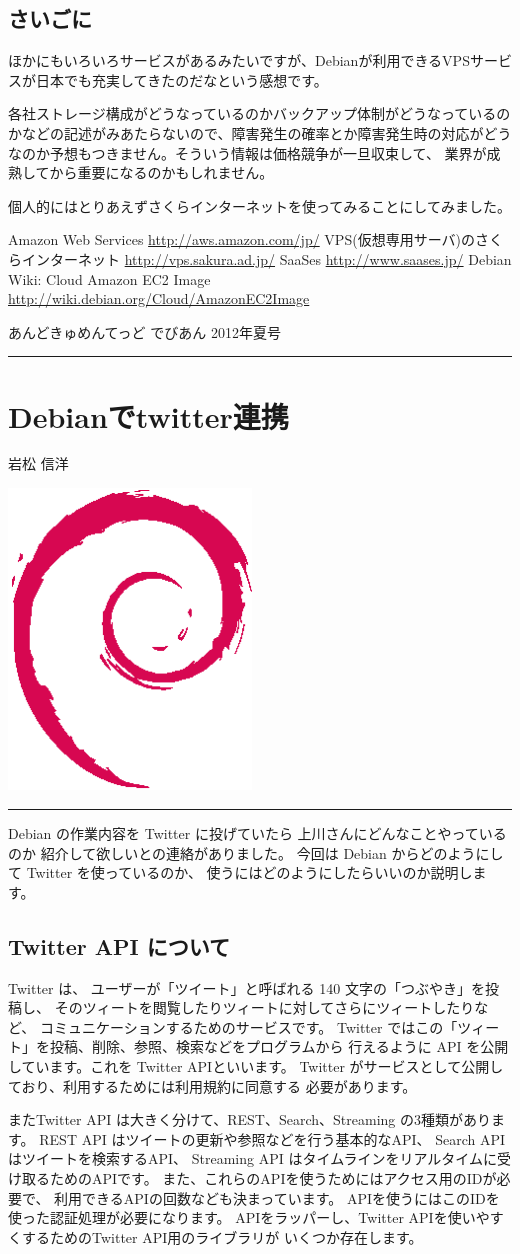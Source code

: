 \documentclass[mingoth,a4paper]{jsarticle}
\renewcommand{\dancersection}[2]{%
\newpage
あんどきゅめんてっど でびあん 2012年夏号
%
\vspace{0.1mm}\\
{\color{dancerdarkblue}\rule{\hsize}{2mm}}

%
%
\begin{minipage}[t]{0.6\hsize}
\color{dancerdarkblue}
\vspace{1cm}
\section{#1}
\hfill{}#2\\
\end{minipage}
\begin{minipage}[t]{0.4\hsize}
\vspace{-2cm}
\hfill{}\includegraphics[height=8cm]{image200502/openlogo-nd.eps}\\
\vspace{-5cm}
\end{minipage}
%
{\color{dancerlightblue}\rule{0.66\hsize}{2mm}}
%
\vspace{2cm}
}
\begin{document}
\subsection{さいごに}

ほかにもいろいろサービスがあるみたいですが、Debianが利用できるVPSサービ
スが日本でも充実してきたのだなという感想です。

各社ストレージ構成がどうなっているのかバックアップ体制がどうなっているの
かなどの記述がみあたらないので、障害発生の確率とか障害発生時の対応がどう
なのか予想もつきません。そういう情報は価格競争が一旦収束して、
業界が成熟してから重要になるのかもしれません。

個人的にはとりあえずさくらインターネットを使ってみることにしてみました。

\begin{thebibliography}{0}
  Amazon Web Services \url{http://aws.amazon.com/jp/}
  VPS(仮想専用サーバ)のさくらインターネット
	 \url{http://vps.sakura.ad.jp/}
  SaaSes \url{http://www.saases.jp/}
  Debian Wiki: Cloud Amazon EC2 Image \url{http://wiki.debian.org/Cloud/AmazonEC2Image}
\end{thebibliography}

\clearpage

\dancersection{Debianでtwitter連携}{岩松 信洋}

Debian の作業内容を Twitter に投げていたら 上川さんにどんなことやっているのか
紹介して欲しいとの連絡がありました。
今回は Debian からどのようにして Twitter を使っているのか、
使うにはどのようにしたらいいのか説明します。

\subsection{Twitter API について}

Twitter は、 ユーザーが「ツイート」と呼ばれる 140 文字の「つぶやき」を投稿し、
そのツィートを閲覧したりツィートに対してさらにツィートしたりなど、
コミュニケーションするためのサービスです。
Twitter ではこの「ツィート」を投稿、削除、参照、検索などをプログラムから
行えるように API を公開しています。これを Twitter APIといいます。
Twitter がサービスとして公開しており、利用するためには利用規約に同意する
必要があります。

またTwitter API は大きく分けて、REST、Search、Streaming の3種類があります。
REST API はツイートの更新や参照などを行う基本的なAPI、
Search API はツイートを検索するAPI、
Streaming API はタイムラインをリアルタイムに受け取るためのAPIです。
また、これらのAPIを使うためにはアクセス用のIDが必要で、
利用できるAPIの回数なども決まっています。
APIを使うにはこのIDを使った認証処理が必要になります。
APIをラッパーし、Twitter APIを使いやすくするためのTwitter API用のライブラリが
いくつか存在します。
\end{document}
